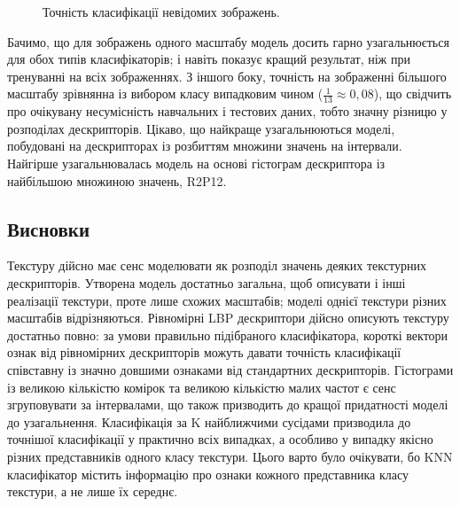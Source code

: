 \begin{figure}[h]
    \caption{Точність класифікації невідомих зображень.}
    \label{fig:precision-3}
\end{figure}

Бачимо, що для зображень одного масштабу модель досить гарно узагальнюється для обох типів класифікаторів; 
і навіть показує кращий результат, ніж при тренуванні на всіх зображеннях.
З іншого боку, точність на зображенні більшого масштабу зрівнянна із вибором класу випадковим чином ($\frac{1}{13} \approx 0,08$), 
що свідчить про очікувану несумісність навчальних і тестових даних, тобто значну різницю у розподілах дескрипторів.
Цікаво, що найкраще узагальнюються моделі, побудовані на дескрипторах із розбиттям множини значень на інтервали.
Найгірше узагальнювалась модель на основі гістограм дескриптора із найбільшою множиною значень, R2P12.



\subsection{Висновки}\label{section2.1f}\hfill

Текстуру дійсно має сенс моделювати як розподіл значень деяких текстурних дескрипторів.
Утворена модель достатньо загальна, щоб описувати і інші реалізації текстури, проте лише схожих масштабів; 
моделі однієї текстури різних масштабів відрізняються.
Рівномірні LBP дескриптори дійсно описують текстуру достатньо повно: за умови правильно підібраного класифікатора, короткі вектори ознак від рівномірних дескрипторів можуть давати точність класифікації 
співставну із значно довшими ознаками від стандартних дескрипторів. 
Гістограми із великою кількістю комірок та великою кількістю малих частот є сенс згруповувати за інтервалами, що також призводить до кращої придатності моделі до узагальнення.
Класифікація за K найближчими сусідами призводила до точнішої класифікації у практично всіх випадках, а особливо у випадку якісно різних представників одного класу текстури.
Цього варто було очікувати, бо KNN класифікатор містить інформацію про ознаки кожного представника класу текстури, а не лише їх середнє.